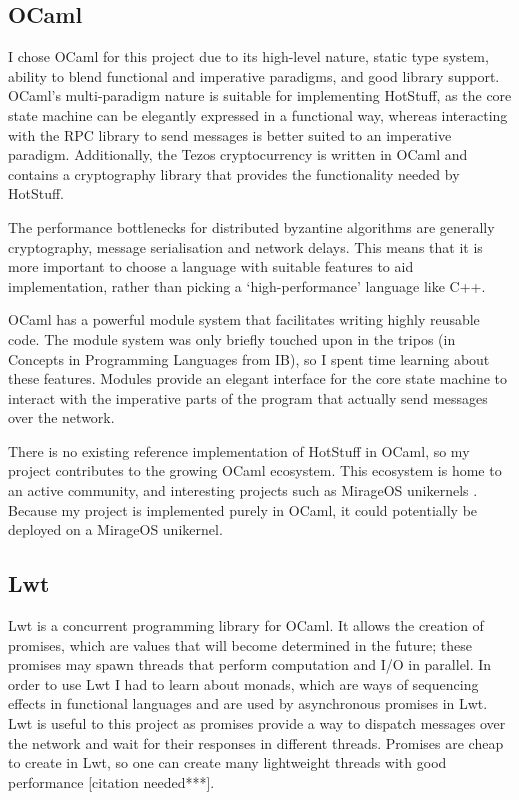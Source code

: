 \subsection{OCaml}
I chose OCaml \cite{noauthor_ocaml_nodate} for this project due to its high-level nature, static type system, ability to blend functional and imperative paradigms, and good library support. OCaml's multi-paradigm nature is suitable for implementing HotStuff, as the core state machine can be elegantly expressed in a functional way, whereas interacting with the RPC library to send messages is better suited to an imperative paradigm. Additionally, the Tezos cryptocurrency is written in OCaml and contains a cryptography library that provides the functionality needed by HotStuff.

The performance bottlenecks for distributed byzantine algorithms are generally cryptography, message serialisation and network delays. This means that it is more important to choose a language with suitable features to aid implementation, rather than picking a `high-performance' language like C++.

OCaml has a powerful module system that facilitates writing highly reusable code. The module system was only briefly touched upon in the tripos (in Concepts in Programming Languages from IB), so I spent time learning about these features. Modules provide an elegant interface for the core state machine to interact with the imperative parts of the program that actually send messages over the network.

There is no existing reference implementation of HotStuff in OCaml, so my project contributes to the growing OCaml ecosystem. This ecosystem is home to an active community, and interesting projects such as MirageOS unikernels \cite{noauthor_mirageos_nodate}. Because my project is implemented purely in OCaml, it could potentially be deployed on a MirageOS unikernel.

\subsection{Lwt}
Lwt \cite{noauthor_lwt_2023} is a concurrent programming library for OCaml. It allows the creation of promises, which are values that will become determined in the future; these promises may spawn threads that perform computation and I/O in parallel. In order to use Lwt I had to learn about monads, which are ways of sequencing effects in functional languages and are used by asynchronous promises in Lwt. Lwt is useful to this project as promises provide a way to dispatch messages over the network and wait for their responses in different threads. Promises are cheap to create in Lwt, so one can create many lightweight threads with good performance [citation needed***].

